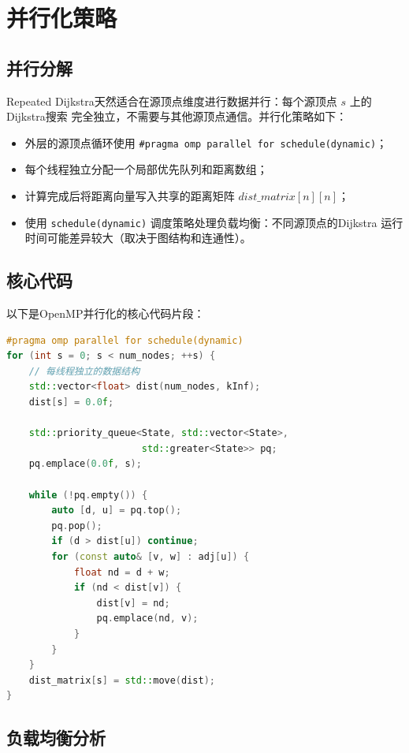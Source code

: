\documentclass[UTF8,a4paper,12pt,fontset=none]{ctexart}
\begin{document}
\section{并行化策略}

\subsection{并行分解}

Repeated Dijkstra天然适合在源顶点维度进行数据并行：每个源顶点 $s$ 上的Dijkstra搜索
完全独立，不需要与其他源顶点通信。并行化策略如下：

\begin{itemize}
  \item 外层的源顶点循环使用 \texttt{\#pragma omp parallel for schedule(dynamic)}；
  \item 每个线程独立分配一个局部优先队列和距离数组；
  \item 计算完成后将距离向量写入共享的距离矩阵 $\mathit{dist\_matrix}[n][n]$；
  \item 使用 \texttt{schedule(dynamic)} 调度策略处理负载均衡：不同源顶点的Dijkstra
        运行时间可能差异较大（取决于图结构和连通性）。
\end{itemize}

\subsection{核心代码}

以下是OpenMP并行化的核心代码片段：

\begin{lstlisting}[language=C++, caption={OpenMP并行Dijkstra的核心代码}]
#pragma omp parallel for schedule(dynamic)
for (int s = 0; s < num_nodes; ++s) {
    // 每线程独立的数据结构
    std::vector<float> dist(num_nodes, kInf);
    dist[s] = 0.0f;

    std::priority_queue<State, std::vector<State>,
                        std::greater<State>> pq;
    pq.emplace(0.0f, s);

    while (!pq.empty()) {
        auto [d, u] = pq.top();
        pq.pop();
        if (d > dist[u]) continue;
        for (const auto& [v, w] : adj[u]) {
            float nd = d + w;
            if (nd < dist[v]) {
                dist[v] = nd;
                pq.emplace(nd, v);
            }
        }
    }
    dist_matrix[s] = std::move(dist);
}
\end{lstlisting}

\subsection{负载均衡分析}
\end{document}
